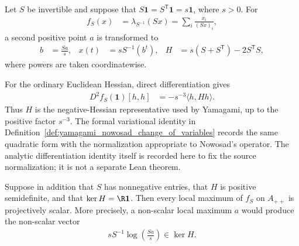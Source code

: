\begin{definition}
    \label{def:yamagami_nowosad_change_of_variables}
    \leanok
    Let $S$ be invertible and suppose that
    $S\mathbf 1=S^{\mathsf T}\mathbf 1=s\mathbf 1$, where $s>0$.  For
    \begin{align}
        f_S(x)&=\lambda_{S^{-1}}(Sx)=\sum_i\frac{x_i}{(Sx)_i},
    \end{align}
    a second positive point $a$ is transformed to
    \begin{align}
        b&=\frac{Sa}{s},
        &x(t)&=sS^{-1}(b^t),
        &H&=s(S+S^{\mathsf T})-2S^{\mathsf T}S,
    \end{align}
    where powers are taken coordinatewise.
\end{definition}

For the ordinary Euclidean Hessian, direct differentiation gives
\begin{align}
    D^2f_S(\mathbf 1)[h,h]
      &=-s^{-3}\langle h,Hh\rangle.
\end{align}
Thus $H$ is the negative-Hessian representative used by Yamagami, up to the
positive factor $s^{-3}$.  The formal variational identity in
Definition~\ref{def:yamagami_nowosad_change_of_variables} records the same
quadratic form with the normalization appropriate to Nowosad's operator.  The
analytic differentiation identity itself is recorded here to fix the source
normalization; it is not a separate Lean theorem.

\begin{theorem}
    \label{thm:yamagami_lemma_three_uniqueness}
    \leanok
    Suppose in addition that $S$ has nonnegative entries, that $H$ is
    positive semidefinite, and that $\ker H=\R\mathbf 1$.  Then every local
    maximum of $f_S$ on $A_{++}$ is projectively scalar.  More precisely,
    a non-scalar local maximum $a$ would produce the non-scalar vector
    \begin{align}
        sS^{-1}\log\!\left(\frac{Sa}{s}\right)\in\ker H.
    \end{align}
\end{theorem}

